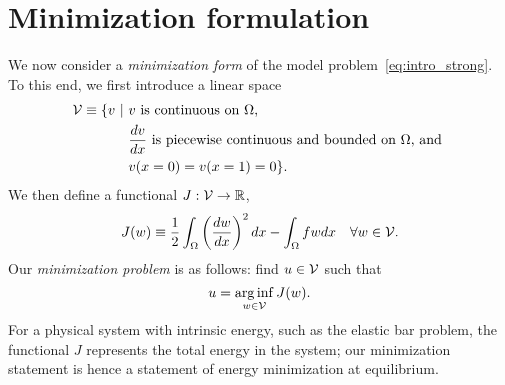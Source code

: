 \section{Minimization formulation}
We now consider a \emph{minimization form} of the model problem~\eqref{eq:intro_strong}.  To this end, we first introduce a linear space
\begin{align}
  \mathcal{V} \equiv \{ v \ | \
  & v \text{ is continuous on $\Omega$, } \\
  & \frac{d v}{d x} \text{ is piecewise continuous and bounded on $\Omega$, and } \\
  & v(x=0) = v(x=1) = 0 \}.
  \label{eq:intro_V}
\end{align}
We then define a functional $J: \mathcal{V} \to \mathbb{R}$,
\begin{equation}
  J(w) \equiv \frac{1}{2} \int_\Omega \left( \frac{d w}{d x} \right)^2 dx - \int_\Omega f w dx \quad \forall w \in \mathcal{V}.
  \label{eq:intro_J}
\end{equation}
Our \emph{minimization problem} is as follows: find $u \in \mathcal{V}$ such that
\begin{equation}
  u = \operatorname*{arg\,inf}_{w \in \mathcal{V}} J(w).
  \label{eq:intro_min}
\end{equation}
For a physical system with intrinsic energy, such as the elastic bar problem, the functional $J$ represents the total energy in the system; our minimization statement is hence a statement of energy minimization at equilibrium. 

